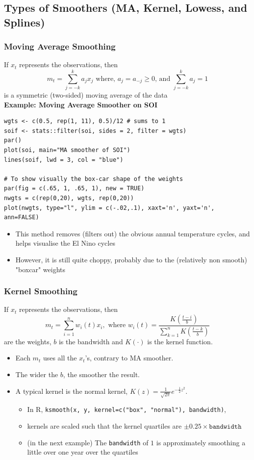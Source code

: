 \documentclass[11pt]{article}
\newcommand{\noi}{\noindent}
\begin{document}
\subsection{Types of Smoothers (MA, Kernel, Lowess, and Splines)}
\subsubsection*{Moving Average Smoothing}
\noi If $x_t$ represents the observations, then
$$m_t = \sum_{j=-k}^{k}{a_jx_j} \text{ where, } a_j = a_{-j} \geq 0 \text{, and } \sum_{j=-k}^{k}a_j = 1$$
\noi is a symmetric (two-sided) moving average of the data \\

\noi \textbf{Example: Moving Average Smoother on SOI}
\begin{lstlisting}
wgts <- c(0.5, rep(1, 11), 0.5)/12 # sums to 1
soif <- stats::filter(soi, sides = 2, filter = wgts)
par()
plot(soi, main="MA smoother of SOI")
lines(soif, lwd = 3, col = "blue")

# To show visually the box-car shape of the weights
par(fig = c(.65, 1, .65, 1), new = TRUE)
nwgts = c(rep(0,20), wgts, rep(0,20))
plot(nwgts, type="l", ylim = c(-.02,.1), xaxt='n', yaxt='n', ann=FALSE)
\end{lstlisting}
\begin{itemize}
    \item This method removes (filters out) the obvious annual temperature cycles, and helps visualise the El Nino cycles
    \item However, it is still quite choppy, probably due to the (relatively non smooth) "boxcar" weights
\end{itemize}

\subsubsection*{Kernel Smoothing}
\noi If $x_t$ represents the observations, then
$$m_t = \sum_{i=1}^n w_{i}(t)x_i, \text{ where } w_i(t) = \frac{K(\frac{t-i}{b})}{\sum_{k=1}^n{K(\frac{t-k}{b})}}$$
\noi are the weights, $b$ is the bandwidth and $K(\cdot)$ is the kernel function.
\begin{itemize}
    \item Each $m_t$ uses all the $x_t$'s, contrary to MA smoother.
    \item The wider the $b$, the smoother the result.
    \item A typical kernel is the normal kernel, $K(z) = \frac{1}{\sqrt{2\pi}}e^{-\frac{1}{2}z^2}$.
        \begin{itemize}
            \item In R, \texttt{ksmooth(x, y, kernel=c("box", "normal"), bandwidth)},
            \item kernels are scaled such that the kernel quartiles are $\pm0.25 \times \texttt{bandwidth}$
            \item (in the next example) The \texttt{bandwidth} of $1$ is approximately smoothing a little over one year over the quartiles
        \end{itemize}
\end{itemize} \phantom{i}
\end{document}
